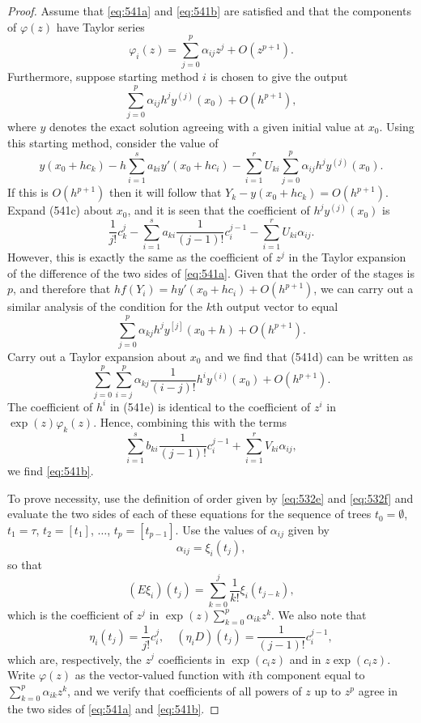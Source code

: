 \begin{proof}
Assume that \eqref{eq:541a} and \eqref{eq:541b} are satisfied and that the components of $\varphi(z)$ have Taylor series
\[
\varphi_i(z) = \sum_{j=0}^{p} \alpha_{ij} z^j + O(z^{p+1}).
\]
Furthermore, suppose starting method $i$ is chosen to give the output
\[
\sum_{j=0}^{p} \alpha_{ij} h^j y^{(j)}(x_0) + O(h^{p+1}),
\]
where $y$ denotes the exact solution agreeing with a given initial value at $x_0$. Using this starting method, consider the value of
\[
y(x_0 + h c_k) - h \sum_{i=1}^{s} a_{ki} y'(x_0 + h c_i) - \sum_{i=1}^{r} U_{ki} \sum_{j=0}^{p} \alpha_{ij} h^j y^{(j)}(x_0). \tag{541c}
\]
If this is $O(h^{p+1})$ then it will follow that $Y_k - y(x_0 + h c_k) = O(h^{p+1})$. Expand (541c) about $x_0$, and it is seen that the coefficient of $h^j y^{(j)}(x_0)$ is
\[
\frac{1}{j!} c_k^j - \sum_{i=1}^{s} a_{ki} \frac{1}{(j-1)!} c_i^{j-1} - \sum_{i=1}^{r} U_{ki} \alpha_{ij}.
\]
However, this is exactly the same as the coefficient of $z^j$ in the Taylor expansion of the difference of the two sides of \eqref{eq:541a}. Given that the order of the stages is $p$, and therefore that $h f(Y_i) = h y'(x_0 + h c_i) + O(h^{p+1})$, we can carry out a similar analysis of the condition for the $k$th output vector to equal
\[
\sum_{j=0}^{p} \alpha_{kj} h^j y^{[j]}(x_0 + h) + O(h^{p+1}). \tag{541d}
\]
Carry out a Taylor expansion about $x_0$ and we find that (541d) can be written as
\[
\sum_{j=0}^{p} \sum_{i=j}^{p} \alpha_{kj} \frac{1}{(i-j)!} h^i y^{(i)}(x_0) + O(h^{p+1}). \tag{541e}
\]
The coefficient of $h^i$ in (541e) is identical to the coefficient of $z^i$ in $\exp(z)\varphi_k(z)$. Hence, combining this with the terms
\[
\sum_{i=1}^{s} b_{ki} \frac{1}{(j-1)!} c_i^{j-1} + \sum_{i=1}^{r} V_{ki} \alpha_{ij},
\]
we find \eqref{eq:541b}.

To prove necessity, use the definition of order given by \eqref{eq:532e} and \eqref{eq:532f} and evaluate the two sides of each of these equations for the sequence of trees $t_0 = \emptyset$, $t_1 = \tau$, $t_2 = [t_1]$, $\dots$, $t_p = [t_{p-1}]$. Use the values of $\alpha_{ij}$ given by
\[
\alpha_{ij} = \xi_i(t_j),
\]
so that
\[
(E\xi_i)(t_j) = \sum_{k=0}^{j} \frac{1}{k!} \xi_i(t_{j-k}),
\]
which is the coefficient of $z^j$ in $\exp(z) \sum_{k=0}^{p} \alpha_{ik} z^k$. We also note that
\[
\eta_i(t_j) = \frac{1}{j!} c_i^j, \quad (\eta_i D)(t_j) = \frac{1}{(j-1)!} c_i^{j-1},
\]
which are, respectively, the $z^j$ coefficients in $\exp(c_i z)$ and in $z \exp(c_i z)$. Write $\varphi(z)$ as the vector-valued function with $i$th component equal to $\sum_{k=0}^{p} \alpha_{ik} z^k$, and we verify that coefficients of all powers of $z$ up to $z^p$ agree in the two sides of \eqref{eq:541a} and \eqref{eq:541b}.
\end{proof}

